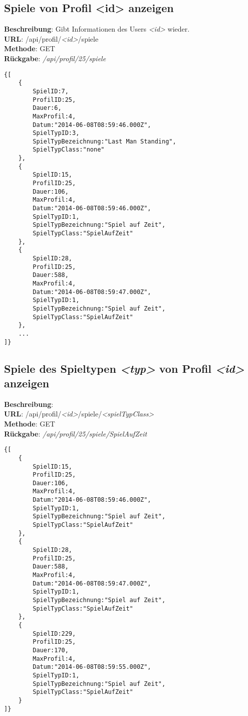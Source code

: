 \documentclass[11pt,a4paper]{article} %
\begin{document}
\subsection*{Spiele von Profil <id> anzeigen}
\textbf{Beschreibung}: Gibt Informationen des Users \textit{<id>} wieder.\\
\textbf{URL}: /api/profil/\textit{<id>}/spiele\\
\textbf{Methode}: GET\\
\textbf{Rückgabe}: \textcolor{kommi}{\textit{/api/profil/25/spiele}}\\
\begin{lstlisting}
{[
	{
		SpielID:7,
		ProfilID:25,
		Dauer:6,
		MaxProfil:4,
		Datum:"2014-06-08T08:59:46.000Z",
		SpielTypID:3,
		SpielTypBezeichnung:"Last Man Standing",
		SpielTypClass:"none"
	},
	{
		SpielID:15,
		ProfilID:25,
		Dauer:106,
		MaxProfil:4,
		Datum:"2014-06-08T08:59:46.000Z",
		SpielTypID:1,
		SpielTypBezeichnung:"Spiel auf Zeit",
		SpielTypClass:"SpielAufZeit"
	},
	{
		SpielID:28,
		ProfilID:25,
		Dauer:588,
		MaxProfil:4,
		Datum:"2014-06-08T08:59:47.000Z",
		SpielTypID:1,
		SpielTypBezeichnung:"Spiel auf Zeit",
		SpielTypClass:"SpielAufZeit"
	},
	...
]}
\end{lstlisting}

\subsection*{Spiele des Spieltypen \textit{<typ>} von Profil \textit{<id>} anzeigen}
\textbf{Beschreibung}: \\
\textbf{URL}: /api/profil/\textit{<id>}/spiele/\textit{<spielTypClass>}\\
\textbf{Methode}: GET\\
\textbf{Rückgabe}: \textcolor{kommi}{\textit{/api/profil/25/spiele/SpielAufZeit}}\\
\begin{lstlisting}
{[
	{
		SpielID:15,
		ProfilID:25,
		Dauer:106,
		MaxProfil:4,
		Datum:"2014-06-08T08:59:46.000Z",
		SpielTypID:1,
		SpielTypBezeichnung:"Spiel auf Zeit",
		SpielTypClass:"SpielAufZeit"
	},
	{
		SpielID:28,
		ProfilID:25,
		Dauer:588,
		MaxProfil:4,
		Datum:"2014-06-08T08:59:47.000Z",
		SpielTypID:1,
		SpielTypBezeichnung:"Spiel auf Zeit",
		SpielTypClass:"SpielAufZeit"
	},
	{
		SpielID:229,
		ProfilID:25,
		Dauer:170,
		MaxProfil:4,
		Datum:"2014-06-08T08:59:55.000Z",
		SpielTypID:1,
		SpielTypBezeichnung:"Spiel auf Zeit",
		SpielTypClass:"SpielAufZeit"
	}
]}
\end{lstlisting}
\end{document}
